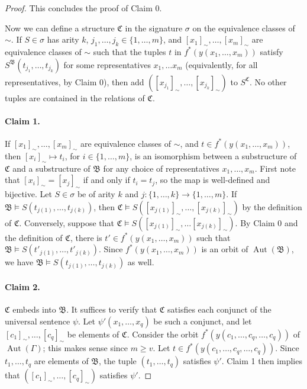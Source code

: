 \documentclass[nonacm]{acmart}
\newcommand{\bB}{{\mathfrak B}}
\newcommand{\bC}{{\mathfrak C}}
\DeclareMathOperator{\Aut}{Aut}
\begin{document}
\begin{proof}
This concludes the proof of Claim 0. 

\medskip 

Now we can define a structure $\bC$ in the signature $\sigma$
on the equivalence classes of $\sim$. 
If $S \in \sigma$ has arity $k$, $j_1,\dots,j_k \in \{1,\dots,m\}$, and 
$[x_1]_\sim,\dots,[x_{m}]_\sim$ are equivalence classes of $\sim$ such that the tuples $t$ in $f^*(y(x_1,\dots,x_m))$ satisfy $S^{\bB}(t_{j_1},\dots,t_{j_k})$ for some representatives $x_1, \dots x_m$ (equivalently, for all representatives, by Claim 0), then add $([x_{j_1}]_\sim,\dots,[x_{j_k}]_\sim)$ to $S^{\bC}$.
No other tuples are contained in the relations of $\bC$.

\paragraph{Claim 1.} 
If $[x_1]_\sim,\dots,[x_m]_\sim$ are equivalence classes of $\sim$, and 
$t \in f^*(y(x_1,\dots,x_m))$, then $[x_i]_{\sim} \mapsto t_i$,
for $i \in \{1,\dots,m\}$, is an isomorphism
between a substructure of $\bC$ and a substructure of $\bB$ for any choice of representatives $x_1, \dots, x_m$. 
First note that $[x_i]_{\sim} = [x_j]_{\sim}$ if and only if $t_i = t_j$, so the map is well-defined and bijective. 
Let $S \in \sigma$ be of arity $k$ and 
$j \colon \{1, \dots, k\} \to \{1, \dots, m \}$. 
If $\bB \models S(t_{j(1)},\dots,t_{j(k)})$, 
then 
$\bC \models S([x_{j(1)}]_\sim,\dots,[x_{j(k)}]_\sim)$ by the definition of $\bC$. 
Conversely, suppose that 
$\bC \models S([x_{j(1)}]_\sim,\dots[x_{j(k)}]_\sim)$. 
By Claim 0 and the definition of $\bC$, there is $t' \in f^*(y(x_1,\dots,x_m))$ such that $\bB \models S(t'_{j(1)},\dots,t'_{j(k)})$. Since $f^*(y(x_1,\dots,x_m))$ is an orbit of $\Aut(\bB)$, we have $\bB \models S(t_{j(1)},\dots,t_{j(k)})$ as well.

\paragraph{Claim 2.} $\bC$ embeds into $\bB$. 
It suffices to verify that $\bC$ satisfies each conjunct of the universal sentence $\psi$. 
Let $\psi'(x_1,\dots,x_q)$ be such a conjunct, and let $[c_1]_\sim,\dots,[c_q]_\sim$ be elements of $\bC$. Consider the orbit $f^*(y(c_1,\dots,c_q,\dots,c_q))$ of $\Aut(\Gamma)$; this makes sense since $m \geq v$. Let $t \in f^*(y(c_1,\dots,c_q,\dots,c_q))$.
Since $t_1, \dots, t_q$ are elements of $\bB$, the tuple $(t_1,\dots,t_q)$ satisfies $\psi'$.
Claim 1 then implies that $([c_1]_\sim,\dots,[c_q]_\sim)$ satisfies $\psi'$. 


\end{proof}
\end{document}
